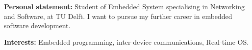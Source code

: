 %
%

\par{
{\textbf{Personal statement:}} 
Student of Embedded System specialising in Networking and Software, at TU Delft. I want to pursue my further career in embedded software development.

{\textbf{Interests:}} 
Embedded programming, inter-device communications, Real-time OS. 
}